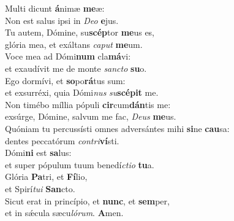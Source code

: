 \evenverse Multi dicunt \textbf{á}nimæ \textbf{me}æ:~\*\\
\evenverse Non est salus ipsi in \textit{De}\textit{o} \textbf{e}jus.\\
\oddverse Tu autem, Dómine, su\textbf{scép}tor \textbf{me}us es,~\*\\
\oddverse glória mea, et exáltans \textit{ca}\textit{put} \textbf{me}um.\\
\evenverse Voce mea ad Dómi\textbf{num} cla\textbf{má}vi:~\*\\
\evenverse et exaudívit me de monte \textit{san}\textit{cto} \textbf{su}o.\\
\oddverse Ego dormívi, et \textbf{so}po\textbf{rá}tus sum:~\*\\
\oddverse et exsurréxi, quia Dómi\textit{nus} \textit{su}\textbf{scé}\textbf{pit} me.\\
\evenverse Non timébo míllia pópuli \textbf{cir}cum\textbf{dán}tis me:~\*\\
\evenverse exsúrge, Dómine, salvum me fac, \textit{De}\textit{us} \textbf{me}us.\\
\oddverse Quóniam tu percussísti omnes adversántes mihi \textbf{si}ne \textbf{cau}sa:~\*\\
\oddverse dentes peccatórum \textit{con}\textit{tri}\textbf{ví}sti.\\
\evenverse Dómi\textbf{ni} est \textbf{sa}lus:~\*\\
\evenverse et super pópulum tuum benedí\textit{cti}\textit{o} \textbf{tu}a.\\
\oddverse Glória \textbf{Pa}tri, et \textbf{Fí}lio,~\*\\
\oddverse et Spirí\textit{tu}\textit{i} \textbf{San}cto.\\
\evenverse Sicut erat in princípio, et \textbf{nunc}, et \textbf{sem}per,~\*\\
\evenverse et in sǽcula sæcu\textit{ló}\textit{rum}. \textbf{A}men.\\

